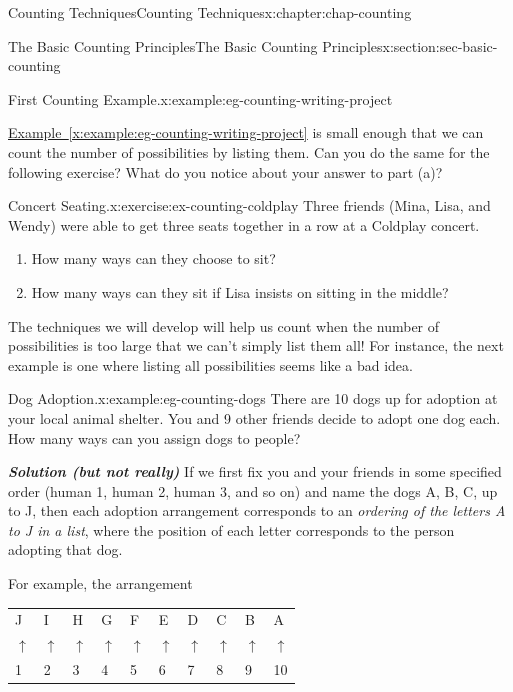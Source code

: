 \documentclass[oneside,10pt,]{book}
\newcommand{\tabularfont}{\relax}
\newcommand{\xreffont}{\relax}
\newcommand{\alert}[1]{\textbf{\textit{#1}}}
\numberwithin{equation}{section}
\begin{document}
\begin{chapterptx}{Counting Techniques}{}{Counting Techniques}{}{}{x:chapter:chap-counting}
\begin{sectionptx}{The Basic Counting Principles}{}{The Basic Counting Principles}{}{}{x:section:sec-basic-counting}
\begin{example}{First Counting Example.}{x:example:eg-counting-writing-project}
\begin{sidebyside}{1}{0.2}{0.2}{0}
\end{sidebyside}%
\end{example}
\hyperref[x:example:eg-counting-writing-project]{Example~{\xreffont\ref{x:example:eg-counting-writing-project}}} is small enough that we can count the number of possibilities by listing them. Can you do the same for the following exercise? What do you notice about your answer to part (a)?%
\begin{inlineexercise}{Concert Seating.}{x:exercise:ex-counting-coldplay}%
Three friends (Mina, Lisa, and Wendy) were able to get three seats together in a row at a Coldplay concert.%
\begin{enumerate}[label=(\alph*)]
\item{}How many ways can they choose to sit?%
\item{}How many ways can they sit if Lisa insists on sitting in the middle?%
\end{enumerate}
%
\end{inlineexercise}
The techniques we will develop will help us count when the number of possibilities is too large that we can't simply list them all! For instance, the next example is one where listing all possibilities seems like a bad idea.%
\begin{example}{Dog Adoption.}{x:example:eg-counting-dogs}%
There are 10 dogs up for adoption at your local animal shelter. You and 9 other friends decide to adopt one dog each. How many ways can you assign dogs to people?%
\par
\alert{Solution (but not really)} If we first fix you and your friends in some specified order (human 1, human 2, human 3, and so on) and name the dogs A, B, C, up to J, then each adoption arrangement corresponds to an \emph{ordering of the letters A to J in a list}, where the position of each letter corresponds to the person adopting that dog.%
\par
For example, the arrangement%
\begin{sidebyside}{1}{0.1}{0.1}{0}%
\begin{sbspanel}{0.8}%
{\centering%
{\tabularfont%
\begin{tabular}{llllllllll}
J&I&H&G&F&E&D&C&B&A\tabularnewline[0pt]
\(\uparrow\)&\(\uparrow\)&\(\uparrow\)&\(\uparrow\)&\(\uparrow\)&\(\uparrow\)&\(\uparrow\)&\(\uparrow\)&\(\uparrow\)&\(\uparrow\)\tabularnewline[0pt]
1&2&3&4&5&6&7&8&9&10
\end{tabular}
}%
\par}
\end{sbspanel}%
\end{sidebyside}%

\end{example}
\end{sectionptx}
\end{chapterptx}
\end{document}
